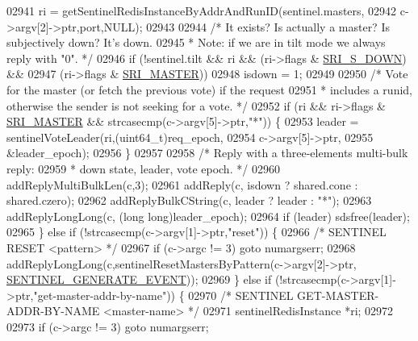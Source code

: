 \begin{DoxyCode}
{{{{{{{{{{{{{{{{{{{{{{{{{{{{{{{{{{{{{{{{{{{{{{{{{{{{{{{{{02941         ri = getSentinelRedisInstanceByAddrAndRunID(sentinel.masters,
02942             c->argv[2]->ptr,port,NULL);
02943 
02944         \textcolor{comment}{/* It exists? Is actually a master? Is subjectively down? It's down.}
02945 \textcolor{comment}{         * Note: if we are in tilt mode we always reply with "0". */}
02946         \textcolor{keywordflow}{if} (!sentinel.tilt && ri && (ri->flags & \hyperlink{sentinel_8c_a8e26596c8bde451c2dd9cecb2c3046d4}{SRI\_S\_DOWN}) &&
02947                                     (ri->flags & \hyperlink{sentinel_8c_a2ee83e5ff67b45746cd6a310f15334b2}{SRI\_MASTER}))
02948             isdown = 1;
02949 
02950         \textcolor{comment}{/* Vote for the master (or fetch the previous vote) if the request}
02951 \textcolor{comment}{         * includes a runid, otherwise the sender is not seeking for a vote. */}
02952         \textcolor{keywordflow}{if} (ri && ri->flags & \hyperlink{sentinel_8c_a2ee83e5ff67b45746cd6a310f15334b2}{SRI\_MASTER} && strcasecmp(c->argv[5]->ptr,\textcolor{stringliteral}{"*"})) \{
02953             leader = sentinelVoteLeader(ri,(uint64\_t)req\_epoch,
02954                                             c->argv[5]->ptr,
02955                                             &leader\_epoch);
02956         \}
02957 
02958         \textcolor{comment}{/* Reply with a three-elements multi-bulk reply:}
02959 \textcolor{comment}{         * down state, leader, vote epoch. */}
02960         addReplyMultiBulkLen(c,3);
02961         addReply(c, isdown ? shared.cone : shared.czero);
02962         addReplyBulkCString(c, leader ? leader : \textcolor{stringliteral}{"*"});
02963         addReplyLongLong(c, (\textcolor{keywordtype}{long} \textcolor{keywordtype}{long})leader\_epoch);
02964         \textcolor{keywordflow}{if} (leader) sdsfree(leader);
02965     \} \textcolor{keywordflow}{else} \textcolor{keywordflow}{if} (!strcasecmp(c->argv[1]->ptr,\textcolor{stringliteral}{"reset"})) \{
02966         \textcolor{comment}{/* SENTINEL RESET <pattern> */}
02967         \textcolor{keywordflow}{if} (c->argc != 3) \textcolor{keywordflow}{goto} numargserr;
02968         addReplyLongLong(c,sentinelResetMastersByPattern(c->argv[2]->ptr,
      \hyperlink{sentinel_8c_a824209bfd4f15f07b6555fb19d8ba328}{SENTINEL\_GENERATE\_EVENT}));
02969     \} \textcolor{keywordflow}{else} \textcolor{keywordflow}{if} (!strcasecmp(c->argv[1]->ptr,\textcolor{stringliteral}{"get-master-addr-by-name"})) \{
02970         \textcolor{comment}{/* SENTINEL GET-MASTER-ADDR-BY-NAME <master-name> */}
02971         sentinelRedisInstance *ri;
02972 
02973         \textcolor{keywordflow}{if} (c->argc != 3) \textcolor{keywordflow}{goto} numargserr;
}}}}}}}}}}}}}}}}}}}}}}}}}}}}}}}}}}}}}}}}}}}}}}}}}}}}}}}}}
\end{DoxyCode}
